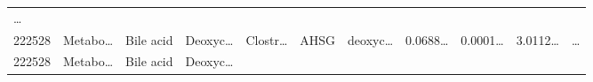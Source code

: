 \documentclass[
]{article}
\begin{document}
\begin{longtable}[]{@{}lllllllllll@{}}
\begin{minipage}[t]{0.03\columnwidth}
\ldots{}\strut
\end{minipage}\tabularnewline
\begin{minipage}[t]{0.05\columnwidth}\raggedright
222528\strut
\end{minipage} & \begin{minipage}[t]{0.07\columnwidth}\raggedright
Metabo\ldots{}\strut
\end{minipage} & \begin{minipage}[t]{0.07\columnwidth}\raggedright
Bile acid\strut
\end{minipage} & \begin{minipage}[t]{0.09\columnwidth}\raggedright
Deoxyc\ldots{}\strut
\end{minipage} & \begin{minipage}[t]{0.07\columnwidth}\raggedright
Clostr\ldots{}\strut
\end{minipage} & \begin{minipage}[t]{0.07\columnwidth}\raggedright
AHSG\strut
\end{minipage} & \begin{minipage}[t]{0.09\columnwidth}\raggedright
deoxyc\ldots{}\strut
\end{minipage} & \begin{minipage}[t]{0.07\columnwidth}\raggedright
0.0688\ldots{}\strut
\end{minipage} & \begin{minipage}[t]{0.07\columnwidth}\raggedright
0.0001\ldots{}\strut
\end{minipage} & \begin{minipage}[t]{0.07\columnwidth}\raggedright
3.0112\ldots{}\strut
\end{minipage} & \begin{minipage}[t]{0.03\columnwidth}\raggedright
\ldots{}\strut
\end{minipage}\tabularnewline
\begin{minipage}[t]{0.05\columnwidth}\raggedright
222528\strut
\end{minipage} & \begin{minipage}[t]{0.07\columnwidth}\raggedright
Metabo\ldots{}\strut
\end{minipage} & \begin{minipage}[t]{0.07\columnwidth}\raggedright
Bile acid\strut
\end{minipage} & \begin{minipage}[t]{0.09\columnwidth}\raggedright
Deoxyc\ldots{}\strut
\end{minipage} & \begin{minipage}[t]{0.07\columnwidth}\raggedright

\end{minipage}
\end{longtable}
\end{document}

